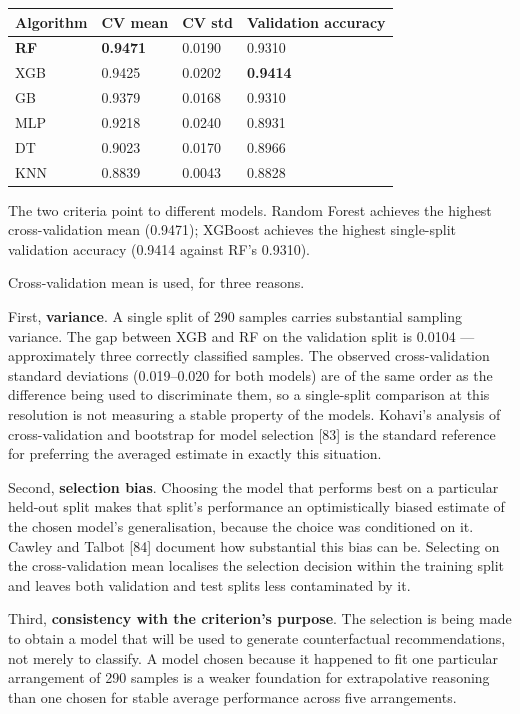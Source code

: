 \begin{longtable}[]{@{}llll@{}}
\toprule\noalign{}
Algorithm & CV mean & CV std & Validation accuracy \\
\midrule\noalign{}
\endhead
\bottomrule\noalign{}
\endlastfoot
\textbf{RF} & \textbf{0.9471} & 0.0190 & 0.9310 \\
XGB & 0.9425 & 0.0202 & \textbf{0.9414} \\
GB & 0.9379 & 0.0168 & 0.9310 \\
MLP & 0.9218 & 0.0240 & 0.8931 \\
DT & 0.9023 & 0.0170 & 0.8966 \\
KNN & 0.8839 & 0.0043 & 0.8828 \\
\end{longtable}

The two criteria point to different models. Random Forest achieves the highest cross-validation mean (0.9471); XGBoost achieves the highest single-split validation accuracy (0.9414 against RF's 0.9310).

Cross-validation mean is used, for three reasons.

First, \textbf{variance}. A single split of 290 samples carries substantial sampling variance. The gap between XGB and RF on the validation split is 0.0104 --- approximately three correctly classified samples. The observed cross-validation standard deviations (0.019--0.020 for both models) are of the same order as the difference being used to discriminate them, so a single-split comparison at this resolution is not measuring a stable property of the models. Kohavi's analysis of cross-validation and bootstrap for model selection {[}83{]} is the standard reference for preferring the averaged estimate in exactly this situation.

Second, \textbf{selection bias}. Choosing the model that performs best on a particular held-out split makes that split's performance an optimistically biased estimate of the chosen model's generalisation, because the choice was conditioned on it. Cawley and Talbot {[}84{]} document how substantial this bias can be. Selecting on the cross-validation mean localises the selection decision within the training split and leaves both validation and test splits less contaminated by it.

Third, \textbf{consistency with the criterion's purpose}. The selection is being made to obtain a model that will be used to generate counterfactual recommendations, not merely to classify. A model chosen because it happened to fit one particular arrangement of 290 samples is a weaker foundation for extrapolative reasoning than one chosen for stable average performance across five arrangements.


